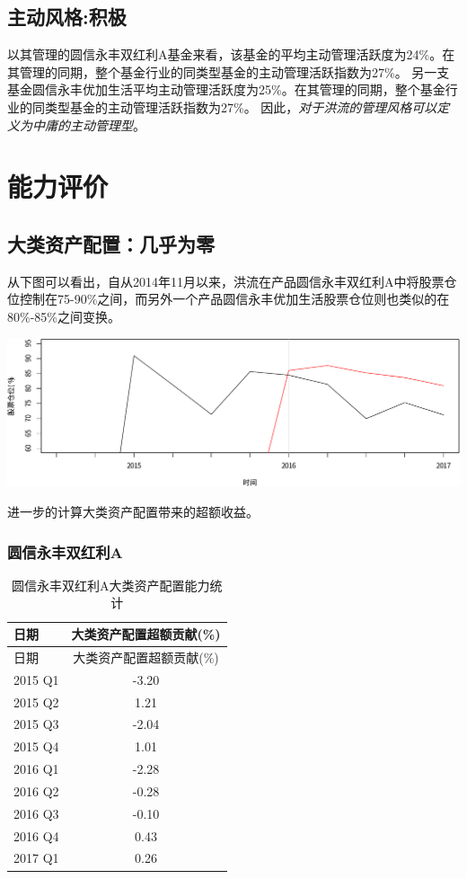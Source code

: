\documentclass[hyperref,]{ctexart}
\begin{document}
\subsection{主动风格:积极}

以其管理的圆信永丰双红利A基金来看，该基金的平均主动管理活跃度为24\%。在其管理的同期，整个基金行业的同类型基金的主动管理活跃指数为27\%。
另一支基金圆信永丰优加生活平均主动管理活跃度为25\%。在其管理的同期，整个基金行业的同类型基金的主动管理活跃指数为27\%。
因此，\emph{对于洪流的管理风格可以定义为中庸的主动管理型}。

\section{能力评价}

\subsection{大类资产配置：几乎为零}

从下图可以看出，自从2014年11月以来，洪流在产品圆信永丰双红利A中将股票仓位控制在75-90\%之间，而另外一个产品圆信永丰优加生活股票仓位则也类似的在80\%-85\%之间变换。

\includegraphics{hongliu-details_files/figure-latex/unnamed-chunk-11-1.pdf}

进一步的计算大类资产配置带来的超额收益。

\subsubsection{圆信永丰双红利A}\label{a-2}

\begin{longtable}[]{@{}lc@{}}
\caption{圆信永丰双红利A大类资产配置能力统计}\tabularnewline
\toprule
日期 & 大类资产配置超额贡献(\%)\tabularnewline
\midrule
\endfirsthead
\toprule
日期 & 大类资产配置超额贡献(\%)\tabularnewline
\midrule
\endhead
2015 Q1 & -3.20\tabularnewline
2015 Q2 & 1.21\tabularnewline
2015 Q3 & -2.04\tabularnewline
2015 Q4 & 1.01\tabularnewline
2016 Q1 & -2.28\tabularnewline
2016 Q2 & -0.28\tabularnewline
2016 Q3 & -0.10\tabularnewline
2016 Q4 & 0.43\tabularnewline
2017 Q1 & 0.26\tabularnewline
\bottomrule
\end{longtable}
\end{document}

